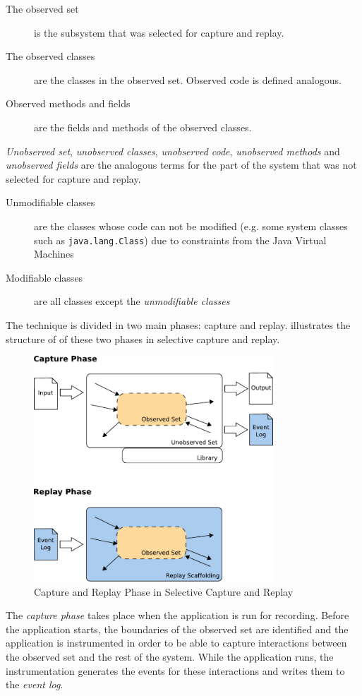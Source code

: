 \begin{description}
	\item [The observed set] is the subsystem that was selected for capture and replay.
	\item [The observed classes] are the classes in the observed set. Observed code is defined analogous.
	\item [Observed methods and fields] are the fields and methods of the observed classes.
\end{description}
\emph{Unobserved set},  \emph{unobserved classes}, \emph{unobserved code}, \emph{unobserved methods} and \emph{unobserved fields} are the analogous terms for the part of the system that was not selected for capture and replay.
\begin{description}
	\item [Unmodifiable classes] are the classes whose code can not be modified (e.g. some system classes such as \texttt{java.lang.Class}) due to constraints from the Java Virtual Machines
	\item [Modifiable classes] are all classes except the \emph{unmodifiable classes}
\end{description}

The technique is divided in two main phases: capture and replay.  illustrates the structure of of these two phases in selective capture and replay.
\begin{figure}[ht]
  \centering
  \includegraphics[width=0.8\textwidth]{illustrations/scr_capture_replay_phase}
  \caption{Capture and Replay Phase in Selective Capture and Replay}
  \label{fig:scr_capture_replay_phase}
\end{figure}
The \emph {capture phase} takes place when the application is run for recording. Before the application starts, the boundaries of the observed set are identified and the application is instrumented in order to be able to capture interactions between the observed set and the rest of the system. While the application runs, the instrumentation generates the events for these interactions and writes them to the \emph{event log}.

